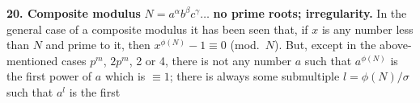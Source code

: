 \documentclass[11pt,a4paper]{article}
\theoremstyle{definition}
\begin{document}
\textbf{20. Composite modulus} $N=a^\alpha b^\beta c^\gamma\ldots$ \textbf{no prime roots; irregularity.} In the general case of a composite modulus it has been seen that, if $x$ is any number less than $N$ and prime to it, then $x^{\phi(N)}-1\equiv0$ (mod.\ $N$). But, except in the above-mentioned cases $p^m$, $2p^m$, 2 or 4, there is not any number $a$ such that $a^{\phi(N)}$ is the first power of $a$ which is $\equiv1$; there is always some submultiple $l=\phi(N)/\sigma$ such that $a^l$ is the first
\end{document}
